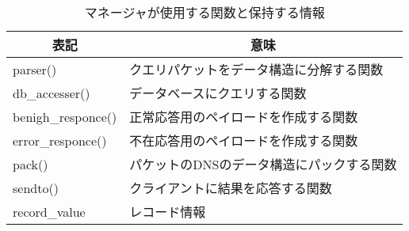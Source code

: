 \begin{table}[htb]
 \caption{マネージャが使用する関数と保持する情報}
 \centering
  \begin{tabular}{ll}
    \toprule
		\multicolumn{1}{c}{\textbf{表記}} & \multicolumn{1}{c}{\textbf{意味}} \\
    \midrule
		parser() & クエリパケットをデータ構造に分解する関数 \\
		db\_accesser() & データベースにクエリする関数 \\
		benigh\_responce() & 正常応答用のペイロードを作成する関数 \\
		error\_responce() & 不在応答用のペイロードを作成する関数 \\
		pack() & パケットのDNSのデータ構造にパックする関数 \\
		sendto() & クライアントに結果を応答する関数 \\
		record\_value & レコード情報 \\
    \bottomrule
  \end{tabular}
 \label{tab:discription-manager}
\end{table}
